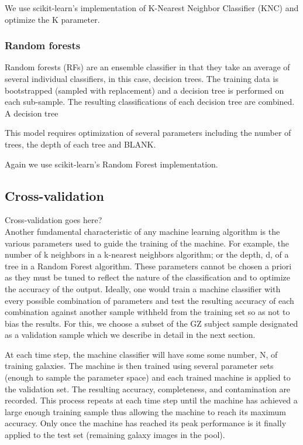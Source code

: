 \documentclass[twocolumn]{aastex6}
\begin{document}
We use scikit-learn's implementation of K-Nearest Neighbor Classifier (KNC) and optimize the K parameter. 

\subsubsection{Random forests}
Random forests (RFs) are an ensemble classifier in that they take an average of several individual classifiers, in this case, decision trees. The training data is bootstrapped (sampled with replacement) and a decision tree is performed on each sub-sample. The resulting classifications of each decision tree are combined. A decision tree 

This model requires optimization of several parameters including the number of trees, the depth of each tree and BLANK. 

Again we use scikit-learn's Random Forest implementation. 


\subsection{Cross-validation}
Cross-validation goes here? \\
Another fundamental characteristic of any machine learning algorithm is the various parameters used to guide the training of the machine. For example, the number of k neighbors in a k-nearest neighbors algorithm; or the depth, d, of a tree in a Random Forest algorithm. These parameters cannot be chosen a priori as they must be tuned to reflect the nature of the classification and to optimize the accuracy of the output. Ideally, one would train a machine classifier with every possible combination of parameters and test the resulting accuracy of each combination against another sample withheld from the training set so as not to bias the results. For this, we choose a subset of the GZ subject sample designated as a validation sample which we describe in detail in the next section. 

At each time step, the machine classifier will have some some number, N, of training galaxies. The machine is then trained using several parameter sets (enough to sample the parameter space) and each trained machine is applied to the validation set. The resulting accuracy, completeness, and contamination are recorded. This process repeats at each time step until the machine has achieved a large enough training sample thus allowing the machine to reach its maximum accuracy. Only once the machine has reached its peak performance is it finally applied to the test set (remaining galaxy images in the pool). 
\end{document}
